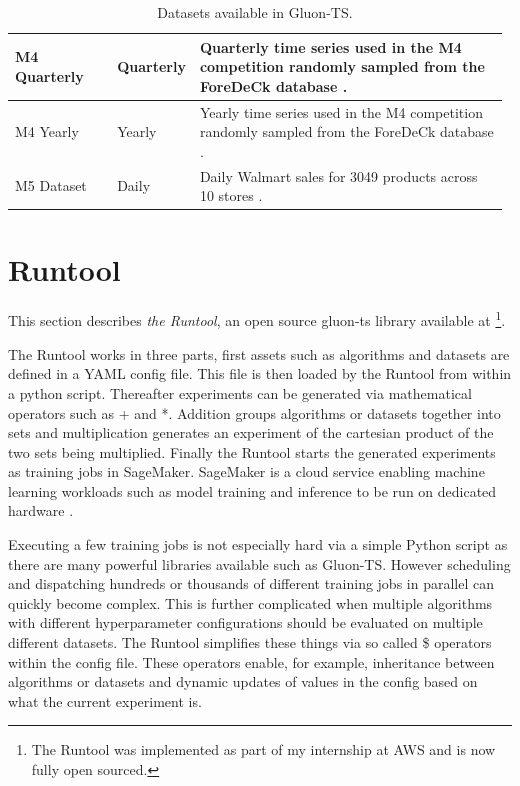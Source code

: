 \begin{table}[h]
\begin{tabular}{p{0.21\linewidth} | p{0.11\linewidth} | p{0.66\linewidth}}
    \hline
    M4 Quarterly       & Quarterly & Quarterly time series used in the M4 competition randomly sampled from the ForeDeCk database \cite{makridakis_m4_2020}.                                                                                                                                            \\
    \hline
    M4 Yearly          & Yearly    & Yearly time series used in the M4 competition randomly sampled from the ForeDeCk database \cite{makridakis_m4_2020}.                                                                                                                                               \\
    \hline
    M5 Dataset         & Daily     & Daily Walmart sales for 3049 products across 10 stores \cite{gluonts-github, m5}.
  \end{tabular}
  \caption{Datasets available in Gluon-TS.}
  \label{tab:datasets}
\end{table}
\clearpage
\section{Runtool}
\label{subsec:runtool}
This section describes \textit{the Runtool}, an open source gluon-ts library available at \cite{the_runtool}\footnote{The Runtool was implemented as part of my internship at AWS and is now fully open sourced.}.

The Runtool works in three parts, first assets such as algorithms and datasets are defined in a YAML config file. This file is then loaded by the Runtool from within a python script. Thereafter experiments can be generated via mathematical operators such as + and *. Addition groups algorithms or datasets together into sets and multiplication generates an experiment of the cartesian product of the two sets being multiplied. Finally the Runtool starts the generated experiments as training jobs in SageMaker. SageMaker is a cloud service enabling machine learning workloads such as model training and inference to be run on dedicated hardware \cite{sagemaker_website}.

Executing a few training jobs is not especially hard via a simple Python script as there are many powerful libraries available such as Gluon-TS. However scheduling and dispatching hundreds or thousands of different training jobs in parallel can quickly become complex. This is further complicated when multiple algorithms with different hyperparameter configurations should be evaluated on multiple different datasets. The Runtool simplifies these things via so called \$ operators within the config file. These operators enable, for example, inheritance between algorithms or datasets and dynamic updates of values in the config based on what the current experiment is.

